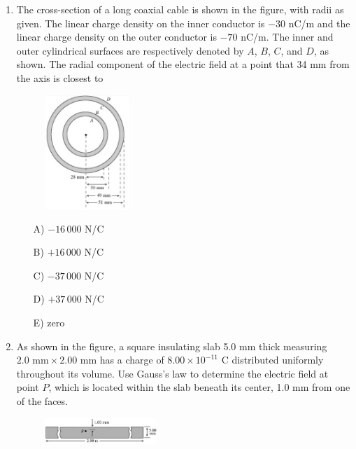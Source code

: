 \begin{enumerate}

    \item The cross-section of a long coaxial cable is shown in the figure, with radii as given. The linear charge density on the inner conductor is $-30$ nC/m and the linear charge density on the outer conductor is $-70$ nC/m. The inner and outer cylindrical surfaces are respectively denoted by $A$, $B$, $C$, and $D$, as shown. The radial component of the electric field at a point that 34 mm from the axis is closest to

    \begin{figure}[H]
        \centering
        \includegraphics[width=0.3\textwidth]{figures-workshop01/problem-24.png}
    \end{figure}

    \begin{multicols}{5}
    \begin{itemize}
        \item[A)] $-16\,000$ N/C
        \item[B)] $+16\,000$ N/C
        \item[C)] $-37\,000$ N/C
        \item[D)] $+37\,000$ N/C
        \item[E)] zero
    \end{itemize}
    \end{multicols}


    \item As shown in the figure, a square insulating slab 5.0 mm thick measuring $2.0\text{ mm}\times2.00\text{ mm}$ has a charge of $8.00\times10^{-11}$ C distributed uniformly throughout its volume. Use Gauss's law to determine the electric field at point $P$, which is located within the slab beneath its center, 1.0 mm from one of the faces.

    \begin{figure}[H]
        \centering
        \includegraphics[width=0.4\textwidth]{figures-workshop01/problem-25.png}
    \end{figure}


\end{enumerate}
